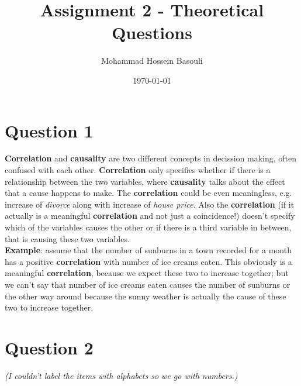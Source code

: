 \documentclass[a4paper,12pt]{article}
\begin{document}
\title{Assignment 2 - Theoretical Questions}
\author{Mohammad Hossein Basouli}
\date{\today}
\maketitle

\section*{Question 1}
\textbf{Correlation} and \textbf{causality} are two different concepts in decission making, often confused with each other. \textbf{Correlation} only specifies whether if there is a relationship
between the two variables, where \textbf{causality} talks about the effect that a cause happens to make. The \textbf{correlation} could be even meaningless, e.g. increase of \textit{divorce} along with increase
of \textit{house price}. Also the \textbf{correlation} (if it actually is a meaningful \textbf{correlation} and not just a coincidence!) doesn't specify which of the variables causes the other or if there is a 
third variable in between, that is causing these two variables. \\

\noindent \textbf{Example}: assume that the number of sunburns in a town recorded for a month has a positive \textbf{correlation} with number of ice creams eaten. This obviously is a meaningful \textbf{correlation}, 
because we expect these two to increase together; but we can't say that number of ice creams eaten causes the number of sunburns or the other way around because the sunny weather is actually the cause of these two to increase together. 

\section*{Question 2}
\textit{(I couldn't label the items with alphabets so we go with numbers.)}
\end{document}
